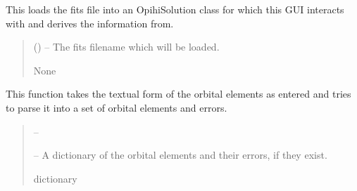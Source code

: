 \documentclass[letterpaper,11pt,english]{sphinxmanual}
\begin{document}
\begin{savenotes}
\begin{fulllineitems}
\begin{savenotes}
\begin{fulllineitems}
\sphinxAtStartPar
This loads the fits file into an OpihiSolution class for which this
GUI interacts with and derives the information from.
\begin{quote}\begin{description}
\sphinxAtStartPar
{} () – The fits filename which will be loaded.

\sphinxAtStartPar
None

\end{description}\end{quote}

\end{fulllineitems}\end{savenotes}


\begin{savenotes}\begin{fulllineitems}
\label{\detokenize{code/opihiexarata.gui.manual:opihiexarata.gui.manual.OpihiManualWindow._parse_custom_orbital_elements}}
\pysigstartsignatures
{}
\pysigstopsignatures
\sphinxAtStartPar
This function takes the textual form of the orbital elements as
entered and tries to parse it into a set of orbital elements and errors.
\begin{quote}\begin{description}
\sphinxAtStartPar
{} – 

\sphinxAtStartPar
{} – A dictionary of the orbital elements and their errors, if they
exist.

\sphinxAtStartPar
dictionary

\end{description}\end{quote}

\end{fulllineitems}\end{savenotes}



\end{fulllineitems}
\end{savenotes}
\end{document}
